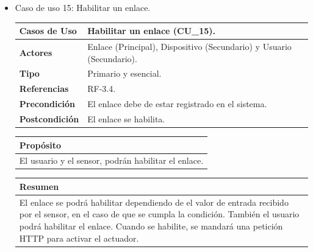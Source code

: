 \begin{itemize}
\begin{table}[h!]
        \caption{Caso de uso 14: Borrar un enlace.}
        \label{table:caso-de-uso-14}
    \end{table}
    
    \newpage
    
    \item Caso de uso 15: Habilitar un enlace.
    
    \begin{table}[h!]
        \centering
        \begin{tabular}{|l|p{}|}
            \hline
            \textbf{Casos de Uso}   &   Habilitar un enlace (CU\_15). \\
            \hline 
            \textbf{Actores}        &   Enlace (Principal), Dispositivo (Secundario) y Usuario (Secundario). \\ 
            \hline 
            \textbf{Tipo}           &   Primario y esencial. \\ 
            \hline
            \textbf{Referencias}    &   RF-3.4. \\ 
            \hline
            \textbf{Precondición}   &   El enlace debe de estar registrado en el sistema. \\ 
            \hline
            \textbf{Postcondición}  &   El enlace se habilita. \\ 
            \hline
        \end{tabular}
        
        \vspace{5mm}
        
        \begin{tabular}{|p{\textwidth}|}
            \hline
            \rowcolor{SeaGreen} \textbf{Propósito} \\
            \hline
            \multicolumn{1}{|p{12cm}|}{El usuario y el sensor, podrán habilitar el enlace.} \\ [0.5ex]
            \hline
        \end{tabular}
        
        \vspace{5mm}
        
        \begin{tabular}{|p{\textwidth}|}
            \hline
            \rowcolor{SeaGreen} \textbf{Resumen} \\
            \hline
            \multicolumn{1}{|p{12cm}|}{El enlace se podrá habilitar dependiendo de el valor de entrada recibido por el
            sensor, en el caso de que se cumpla la condición. También el usuario podrá habilitar el enlace. Cuando se habilite,
            se mandará una petición HTTP para activar el actuador.} \\ [0.5ex]
            \hline
        \end{tabular}
        

\end{table}
\end{itemize}
